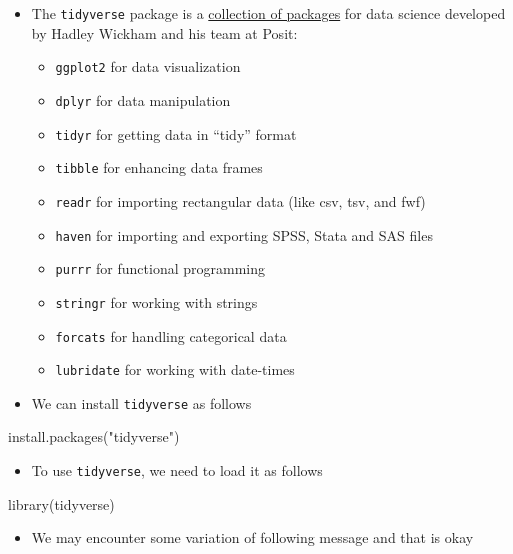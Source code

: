\documentclass[
  letterpaper,
  DIV=11,
  numbers=noendperiod]{scrreprt}
\newenvironment{Shaded}{\begin{snugshade}}{\end{snugshade}}
\newcommand{\FunctionTok}[1]{\textcolor[rgb]{0.28,0.35,0.67}{#1}}
\newcommand{\NormalTok}[1]{\textcolor[rgb]{0.00,0.23,0.31}{#1}}
\newcommand{\StringTok}[1]{\textcolor[rgb]{0.13,0.47,0.30}{#1}}
\providecommand{\tightlist}{%
  \setlength{\itemsep}{0pt}\setlength{\parskip}{0pt}}\usepackage{longtable,booktabs,array}
\begin{document}
\begin{itemize}
\item
  The \texttt{tidyverse} package is a
  \href{https://tidyverse.org/packages/}{collection of packages} for
  data science developed by Hadley Wickham and his team at Posit:

  \begin{itemize}
  \tightlist
  \item
    \texttt{ggplot2} for data visualization
  \item
    \texttt{dplyr} for data manipulation
  \item
    \texttt{tidyr} for getting data in ``tidy'' format
  \item
    \texttt{tibble} for enhancing data frames
  \item
    \texttt{readr} for importing rectangular data (like csv, tsv, and
    fwf)
  \item
    \texttt{haven} for importing and exporting SPSS, Stata and SAS files
  \item
    \texttt{purrr} for functional programming
  \item
    \texttt{stringr} for working with strings
  \item
    \texttt{forcats} for handling categorical data
  \item
    \texttt{lubridate} for working with date-times
  \end{itemize}
\item
  We can install \texttt{tidyverse} as follows
\end{itemize}

\begin{Shaded}
\begin{Highlighting}[]
\FunctionTok{install.packages}\NormalTok{(}\StringTok{"tidyverse"}\NormalTok{)}
\end{Highlighting}
\end{Shaded}

\begin{itemize}
\tightlist
\item
  To use \texttt{tidyverse}, we need to load it as follows
\end{itemize}

\begin{Shaded}
\begin{Highlighting}[]
\FunctionTok{library}\NormalTok{(tidyverse)}
\end{Highlighting}
\end{Shaded}

\begin{itemize}
\tightlist
\item
  We may encounter some variation of following message and that is okay
\end{itemize}
\end{document}
